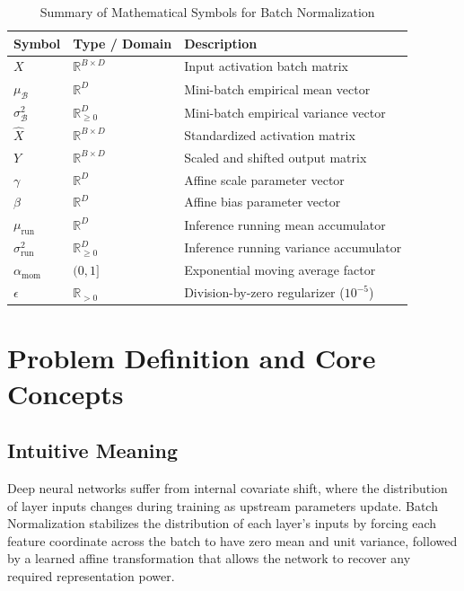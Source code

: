 \documentclass[11pt,a4paper]{article}
\theoremstyle{definition}
\begin{document}
\begin{table}[h]
\centering
\caption{Summary of Mathematical Symbols for Batch Normalization}
\begin{tabular}{lll}
\toprule
\textbf{Symbol} & \textbf{Type / Domain} & \textbf{Description} \\
\midrule
$X$ & $\mathbb{R}^{B \times D}$ & Input activation batch matrix \\
$\mu_{\mathcal{B}}$ & $\mathbb{R}^D$ & Mini-batch empirical mean vector \\
$\sigma_{\mathcal{B}}^2$ & $\mathbb{R}_{\ge 0}^D$ & Mini-batch empirical variance vector \\
$\hat{X}$ & $\mathbb{R}^{B \times D}$ & Standardized activation matrix \\
$Y$ & $\mathbb{R}^{B \times D}$ & Scaled and shifted output matrix \\
$\gamma$ & $\mathbb{R}^D$ & Affine scale parameter vector \\
$\beta$ & $\mathbb{R}^D$ & Affine bias parameter vector \\
$\mu_{\text{run}}$ & $\mathbb{R}^D$ & Inference running mean accumulator \\
$\sigma_{\text{run}}^2$ & $\mathbb{R}_{\ge 0}^D$ & Inference running variance accumulator \\
$\alpha_{\text{mom}}$ & $(0, 1]$ & Exponential moving average factor \\
$\epsilon$ & $\mathbb{R}_{> 0}$ & Division-by-zero regularizer ($10^{-5}$) \\
\bottomrule
\end{tabular}
\end{table}

\section{Problem Definition and Core Concepts}

\subsection{Intuitive Meaning}
Deep neural networks suffer from internal covariate shift, where the distribution of layer inputs changes during training as upstream parameters update. Batch Normalization stabilizes the distribution of each layer's inputs by forcing each feature coordinate across the batch to have zero mean and unit variance, followed by a learned affine transformation that allows the network to recover any required representation power.
\end{document}
